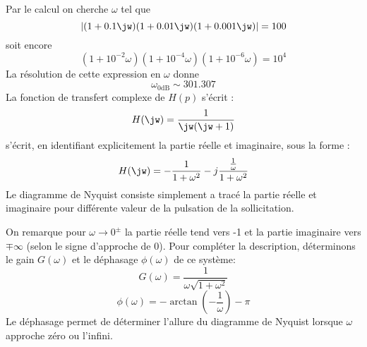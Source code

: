 Par le calcul on cherche $\omega$ tel que 
\[
\left|(1+0.1\jw)(1+0.01\jw)(1+0.001\jw)\right|=100
\]
soit encore
\[
    (1+10^{-2}\omega)(1+10^{-4}\omega)(1+10^{-6}\omega)=10^4    
\]
La résolution de cette expression en $\omega$ donne
\[
    \omega_{0\si{\dB}}\sim301.307 
\]
\question{}
La fonction de transfert complexe de $H(p)$ s'écrit :
\[
    H(\jw)=\dfrac{1}{\jw(\jw+1)}
\]
s'écrit, en identifiant explicitement la partie réelle et imaginaire, sous la 
forme :
\[
    H(\jw)=-\dfrac{1}{1+\omega^2}-j\dfrac{\frac{1}{\omega}}{1+\omega^2}
\]
Le diagramme de Nyquist consiste simplement a tracé la partie réelle et imaginaire
pour différente valeur de la pulsation de la sollicitation.
\begin{figure}[!t]
    \centering
    
\end{figure}
On remarque pour $\omega\rightarrow0^\pm$ la partie réelle tend vers -1 et la 
partie imaginaire vers $\mp\infty$ (selon le signe d'approche de 0).
Pour compléter la description, déterminons le gain $G(\omega)$ et le déphasage 
$\phi(\omega)$ de ce système:
\[
    G(\omega)=\dfrac{1}{\omega\sqrt{1+\omega^2}}
\]
\[
    \phi(\omega)=-\arctan{\left(-\dfrac{1}{\omega}\right)}-\pi
\]
Le déphasage permet de déterminer l'allure du diagramme de Nyquist lorsque $\omega$ 
approche zéro ou l'infini. 

